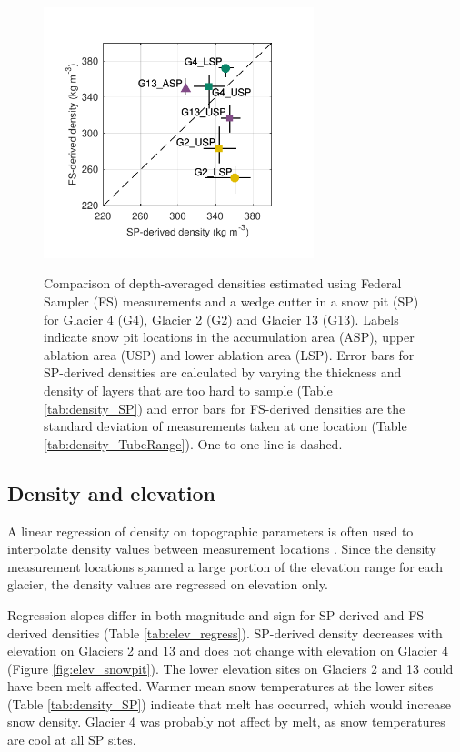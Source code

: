 \documentclass{sfuthesis}
\begin{document}
\begin{figure}[H]
	\centering
	\includegraphics[width =0.7\textwidth]{SPvsFS.pdf}\\
	\caption{Comparison of depth-averaged densities estimated using Federal Sampler (FS) measurements and  a wedge cutter in a snow pit (SP)  for Glacier 4 (G4), Glacier 2 (G2) and Glacier 13 (G13). Labels indicate snow pit locations in the accumulation area (ASP), upper ablation area (USP) and lower ablation area (LSP). Error bars for SP-derived densities are calculated by varying the thickness and density of layers that are too hard to sample (Table \ref{tab:density_SP}) and error bars for FS-derived densities are the standard deviation of measurements taken at one location (Table \ref{tab:density_TubeRange}). One-to-one line is dashed.}
	\label{fig:density_pitVStube}
\end{figure}


\subsection{Density and elevation}

A linear regression of density on topographic parameters is often used to interpolate density values between measurement locations \citep[e.g.][]{Elder1998, Molotch2005,Wetlaufer2016}. Since the density measurement locations spanned a large portion of the elevation range for each glacier, the density values are regressed on elevation only. 

Regression slopes differ in both magnitude and sign for SP-derived and FS-derived densities (Table \ref{tab:elev_regress}). SP-derived density decreases with elevation on Glaciers 2 and 13 and does not change with elevation on Glacier 4 (Figure \ref{fig:elev_snowpit}). The lower elevation sites on Glaciers 2 and 13 could have been melt affected. Warmer mean snow temperatures at the lower sites (Table \ref{tab:density_SP}) indicate that melt has occurred, which would increase snow density. Glacier 4 was probably not affect by melt, as snow temperatures are cool at all SP sites. 
\end{document}
